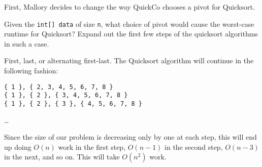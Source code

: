 \begin{blocksection}
\question First, Mallory decides to change the way QuickCo chooses a pivot for
Quicksort.

Given the \lstinline$int[] data$ of size \lstinline$n$, what choice of pivot would 
cause the worst-case runtime for Quicksort? Expand out the first few steps
of the quicksort algorithms in such a case.

\begin{solution}[0.5in]
First, last, or alternating first-last. The Quicksort algorithm will continue 
in the following fashion:

\begin{verbatim}
{ 1 }, { 2, 3, 4, 5, 6, 7, 8 }
{ 1 }, { 2 }, { 3, 4, 5, 6, 7, 8 }
{ 1 }, { 2 }, { 3 }, { 4, 5, 6, 7, 8 }
\end{verbatim}
\ldots

Since the size of our problem is decreasing only by one at each step, this 
will end up doing $O(n)$ work in the first step, $O(n-1)$ in the second step, 
$O(n-3)$ in the next, and so on. This will take $O(n^2)$ work.

\end{solution}
\end{blocksection}
